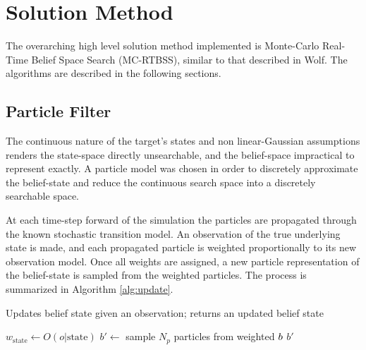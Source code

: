 \section{Solution Method}\label{sec:method}
	The overarching high level solution method implemented is Monte-Carlo Real-Time Belief Space Search (MC-RTBSS), similar to that described in Wolf\cite{Wolf2011}.  The algorithms are described in the following sections.
\subsection{Particle Filter \label{sec:particle}}
	The continuous nature of the target's states and non linear-Gaussian assumptions renders the state-space directly unsearchable, and the belief-space impractical to represent exactly.  A particle model was chosen in order to discretely approximate the belief-state and reduce the continuous search space into a discretely searchable space. 
	 
	At each time-step forward of the simulation the particles are propagated through the known stochastic transition model.  An observation of the true underlying state is made, and each propagated particle is weighted proportionally to its new observation model.  Once all weights are assigned, a new particle representation of the belief-state is sampled from the weighted particles.  The process is summarized in Algorithm \ref{alg:update}.
	\begin{algorithm}\caption{Updates belief state given an observation; returns an updated belief state}\label{alg:update}
	\begin{algorithmic}
			\State $w_{\textrm{state}} \gets O\left(o|\textrm{state}\right)$
		\EndFor
		\State $b' \gets$ sample $N_p$ particles from weighted $b\newline$
		\Return $b'$
	\EndFunction
	\end{algorithmic}
	\end{algorithm}
	
\break
